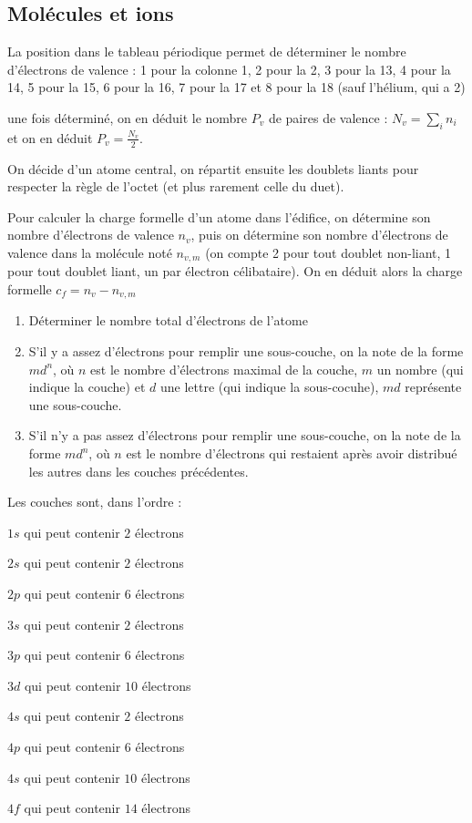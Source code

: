 \documentclass[a4paper,12pt]{book}
\newcommand{\Meth}[2]{\begin{tcolorbox}[colback=white,colframe=green!60!green!30!black!75, title=Méthode :  #1]#2\end{tcolorbox}}
\begin{document}
\subsection{Molécules et ions}
\Meth{Déterminer un schéma de Lewis}{La position dans le tableau périodique permet de déterminer le nombre d'électrons de valence : 1 pour la colonne 1, 2 pour la 2, 3 pour la 13, 4 pour la 14, 5 pour la 15, 6 pour la 16, 7 pour la 17 et 8 pour la 18 (sauf l'hélium, qui a 2)
\par une fois déterminé, on en déduit le nombre $P_v$ de paires de valence : $N_v = \sum\limits_{i}n_i$ et on en déduit $P_v=\frac{N_v}{2}$.
\par On décide d'un atome central, on répartit ensuite les doublets liants pour respecter la règle de l'octet (et plus rarement celle du duet).
\par Pour calculer la charge formelle d'un atome dans l'édifice, on détermine son nombre d'électrons de valence $n_v$, puis on détermine son nombre d'électrons de valence dans la molécule noté $n_{v,m}$ (on compte 2 pour tout doublet non-liant, 1 pour tout doublet liant, un par électron célibataire). On en déduit alors la charge formelle $c_f = n_v-n_{v,m}$ 
}

\Meth{Déterminer la configuration électronique}{\begin{enumerate}
\item Déterminer le nombre total d'électrons de l'atome
\item S'il y a assez d'électrons pour remplir une sous-couche, on la note de la forme $md^n$, où $n$ est le nombre d'électrons maximal de la couche, $m$ un nombre (qui indique la couche) et $d$ une lettre (qui indique la sous-cocuhe), $md$ représente une sous-couche.
\item S'il n'y a pas assez d'électrons pour remplir une sous-couche, on la note de la forme $md^n$, où $n$ est le nombre d'électrons qui restaient après avoir distribué les autres dans les couches précédentes.
\end{enumerate}
Les couches sont, dans l'ordre :
\par $1s$ qui peut contenir $2$ électrons
\par $2s$ qui peut contenir $2$ électrons
\par $2p$ qui peut contenir $6$ électrons
\par $3s$ qui peut contenir $2$ électrons
\par $3p$ qui peut contenir $6$ électrons
\par $3d$ qui peut contenir $10$ électrons
\par $4s$ qui peut contenir $2$ électrons
\par $4p$ qui peut contenir $6$ électrons
\par $4s$ qui peut contenir $10$ électrons
\par $4f$ qui peut contenir $14$ électrons
}
\end{document}

